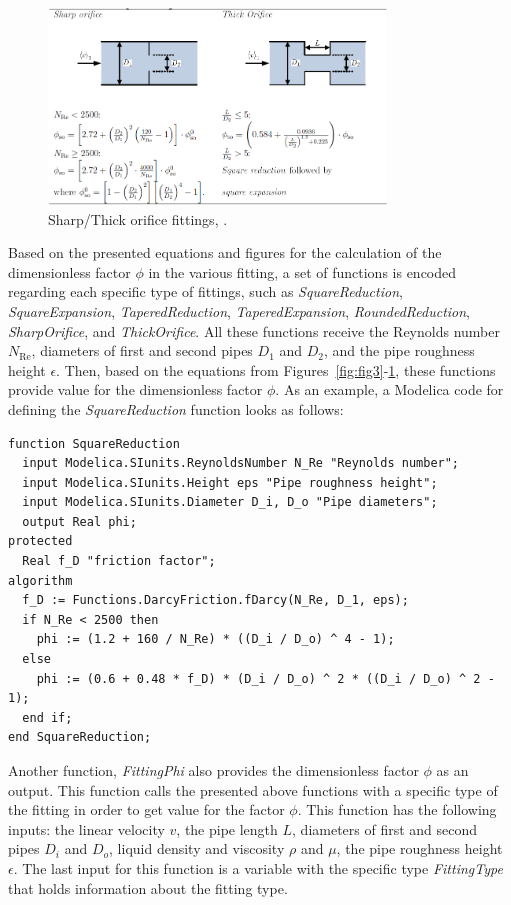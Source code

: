 \documentclass[%
]{USN-PhD}
\begin{document}
\begin{figure}[!ht]
  \centering
 \includegraphics[width=0.8\textwidth]{fig/Sharp_fit}
 \caption{Sharp/Thick orifice fittings, \cite{LieL:18}.}
  \label{fig:fig6}
\end{figure}

Based on the presented equations and figures for the calculation of the dimensionless factor $\phi$ in the various fitting, a set of functions is encoded regarding each specific type of fittings, such as \emph{SquareReduction}, \emph{SquareExpansion}, \emph{TaperedReduction}, \emph{TaperedExpansion}, \emph{RoundedReduction}, \emph{SharpOrifice}, and \emph{ThickOrifice}. All these functions receive the Reynolds number $N_\mathrm{Re}$, diameters of first and second pipes $D_1$ and $D_2$, and the pipe roughness height $\epsilon$. Then, based on the equations from Figures~\ref{fig:fig3}-\ref{fig:fig6}, these functions provide value for the dimensionless factor $\phi$. As an example, a Modelica code for defining the \emph{SquareReduction} function looks as follows:

\begin{lstlisting}[language = modelica]
function SquareReduction
  input Modelica.SIunits.ReynoldsNumber N_Re "Reynolds number";
  input Modelica.SIunits.Height eps "Pipe roughness height";
  input Modelica.SIunits.Diameter D_i, D_o "Pipe diameters";
  output Real phi;
protected
  Real f_D "friction factor";
algorithm
  f_D := Functions.DarcyFriction.fDarcy(N_Re, D_1, eps);
  if N_Re < 2500 then
    phi := (1.2 + 160 / N_Re) * ((D_i / D_o) ^ 4 - 1);
  else
    phi := (0.6 + 0.48 * f_D) * (D_i / D_o) ^ 2 * ((D_i / D_o) ^ 2 - 1);
  end if;
end SquareReduction;
\end{lstlisting}

Another function, \emph{FittingPhi} also provides the dimensionless factor $\phi$ as an output. This function calls the presented above functions with a specific type of the fitting in order to get value for the factor $\phi$. This function has the following inputs: the linear velocity $v$, the pipe length $L$, diameters of first and second pipes $D_i$ and $D_o$, liquid density and viscosity $\rho$ and $\mu$, the pipe roughness height $\epsilon$. The last input for this function is a variable with the specific type \emph{FittingType} that holds information about the fitting type.
\end{document}
